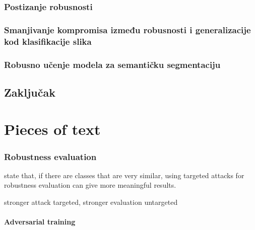 \documentclass[oneside]{book}
\begin{document}
\subsection{Postizanje robusnosti}


\subsection{Smanjivanje kompromisa između robusnosti i generalizacije kod klasifikacije slika}


\subsection{Robusno učenje modela za semantičku segmentaciju}



\section{Zaključak}




\chapter{Pieces of text}

%




\newpage

\subsection{Robustness evaluation}

\citet{Athalye:2018:OGGFSS} state that, if there are classes that are very similar, using targeted attacks for robustness evaluation can give more meaningful results. 

stronger attack targeted, stronger evaluation untargeted

\subsubsection{Adversarial training}
\end{document}
